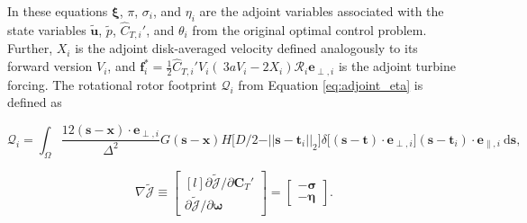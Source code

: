 \documentclass[energies,article,submit,moreauthors,latex,10pt,a4paper]{mdpi}
\newcommand{\ds}{~\text{d}\boldsymbol{s}}
\newcommand{\bs}[1]{\boldsymbol{#1}}
\newcommand{\sint}{\int_{\Omega}}
\newcommand{\utilde}{\widetilde{\bs{u}}}
\newcommand{\ptilde}{\widetilde{p}}
\newcommand{\ctihat}{\widehat{C}_{T,i}'}
\newcommand{\R}{\mathscr{R}}
\newcommand{\Jtilde}{\tilde{\mathscr{J}}}
\newcommand{\eperpi}{\bs{e}_{\perp,i}}
\newcommand{\etransi}{\bs{e}_{\parallel,i}}
\newcommand{\diracdelta}{{\delta}}
\begin{document}
\noindent In these equations $\bs{\xi}$, $\pi$, $\sigma_i$, and $\eta_i$ are the adjoint variables associated with the state variables $\utilde$, $\ptilde$, $\ctihat$, and $\theta_i$ from the original optimal control problem. Further, $X_i$ is the adjoint disk-averaged velocity defined analogously to its forward version $V_i$, and $\bs{f}_i^* = \frac{1}{2} \ctihat V_i (~3a V_i - 2 X_i ) \R_i \eperpi$ is the adjoint turbine forcing. The rotational rotor footprint $\mathscr{Q}_i$ from Equation \eqref{eq:adjoint_eta} is defined as 

\begin{equation}
\mathscr{Q}_i = \sint \frac{12 (\bs{s} - \bs{x})\cdot \eperpi}{\Delta^2} G(\bs{s} - \bs{x})  H\big[D/2 - \vert\vert \bs{s} - \bs{t}_i \vert\vert_2 \big] \diracdelta\big[(\bs{s} - \bs{t})\cdot \eperpi \big]  (\bs{s} - \bs{t}_i) \cdot \etransi \ds,
\end{equation} 




\begin{equation}
\nabla \Jtilde \equiv 
\begin{bmatrix*}[l]
\partial \Jtilde / \partial \bs{C}_T' \\
\partial \Jtilde / \partial \bs{\omega} 
\end{bmatrix*} = 
\begin{bmatrix}
- \bs{\sigma}\\
- \bs{\eta}
\end{bmatrix} \label{eq:problem_gradient}.
\end{equation}
\end{document}
